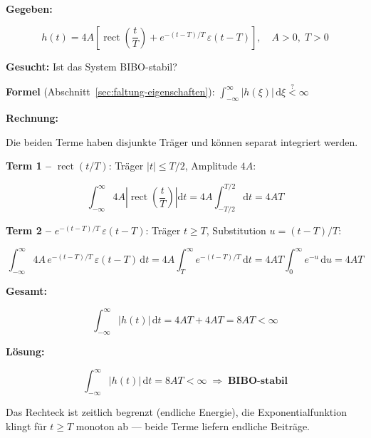 \begin{beispiel}

\textbf{Gegeben:}

$$
h(t) = 4A\!\left[\operatorname{rect}\!\left(\frac{t}{T}\right)
       + e^{-(t-T)/T}\,\varepsilon(t-T)\right],
\quad A > 0,\; T > 0
$$

\textbf{Gesucht:} Ist das System BIBO-stabil?

\textbf{Formel} (Abschnitt~\ref{sec:faltung-eigenschaften}):
$\displaystyle\int_{-\infty}^{\infty}|h(\xi)|\,\mathrm{d}\xi \stackrel{?}{<} \infty$

\textbf{Rechnung:}

Die beiden Terme haben disjunkte Träger und können separat integriert werden.

\textbf{Term 1 –} $\operatorname{rect}(t/T)$: Träger $|t| \leq T/2$, Amplitude $4A$:

$$
\int_{-\infty}^{\infty} 4A\left|\operatorname{rect}\!\left(\frac{t}{T}\right)\right|\mathrm{d}t
= 4A \int_{-T/2}^{T/2}\mathrm{d}t = 4AT
$$

\textbf{Term 2 –} $e^{-(t-T)/T}\,\varepsilon(t-T)$: Träger $t \geq T$, Substitution $u = (t-T)/T$:

$$
\int_{-\infty}^{\infty} 4A\,e^{-(t-T)/T}\,\varepsilon(t-T)\,\mathrm{d}t
= 4A\int_{T}^{\infty} e^{-(t-T)/T}\,\mathrm{d}t
= 4AT\int_{0}^{\infty} e^{-u}\,\mathrm{d}u
= 4AT
$$

\textbf{Gesamt:}

$$
\int_{-\infty}^{\infty}|h(t)|\,\mathrm{d}t = 4AT + 4AT = 8AT < \infty
$$

\textbf{Lösung:}

$$
\boxed{\int_{-\infty}^{\infty}|h(t)|\,\mathrm{d}t = 8AT < \infty \;\Rightarrow\; \textbf{BIBO-stabil}}
$$

Das Rechteck ist zeitlich begrenzt (endliche Energie), die Exponentialfunktion klingt
für $t \geq T$ monoton ab — beide Terme liefern endliche Beiträge.

\end{beispiel}
